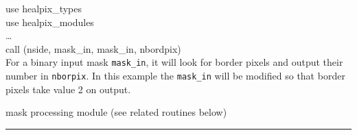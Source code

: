 \begin{example}
{
use healpix\_types \\
use healpix\_modules \\
\ldots \\
call \thedocid(nside, mask\_in, mask\_in, nbordpix)  \\
}
{For a binary input mask {\tt mask\_in}, it will look for border pixels and output
their number in {\tt nborpix}. In this example the {\tt mask\_in} will be
modified so that border pixels take value 2 on output.
}
\end{example}

\begin{modules}
  \begin{sulist}{} %
  \item[\textbf{mask\_tools}] mask processing module (see related routines below)
  \end{sulist}
\end{modules}

\begin{related}
  \begin{sulist}{} %
	\maskToolsRelated
  \end{sulist}
\end{related}

\rule{\hsize}{2mm}

\newpage
